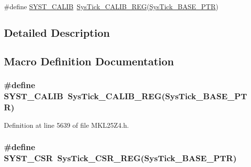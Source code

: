 \begin{DoxyCompactItemize}
\item 
\#define \hyperlink{group___sys_tick___register___accessor___macros_ga2d37582dd39f59744e340cce09230250}{S\+Y\+S\+T\+\_\+\+C\+A\+L\+IB}~\hyperlink{group___sys_tick___register___accessor___macros_gab41be68de8d2d31d938d419f9feb900f}{Sys\+Tick\+\_\+\+C\+A\+L\+I\+B\+\_\+\+R\+EG}(\hyperlink{group___sys_tick___peripheral_gaeef73642fdef722ce658e468dad877ea}{Sys\+Tick\+\_\+\+B\+A\+S\+E\+\_\+\+P\+TR})
\end{DoxyCompactItemize}


\subsection{Detailed Description}


\subsection{Macro Definition Documentation}
\subsubsection[{\texorpdfstring{S\+Y\+S\+T\+\_\+\+C\+A\+L\+IB}{SYST_CALIB}}]{\setlength{\rightskip}{0pt plus 5cm}\#define S\+Y\+S\+T\+\_\+\+C\+A\+L\+IB~{\bf Sys\+Tick\+\_\+\+C\+A\+L\+I\+B\+\_\+\+R\+EG}({\bf Sys\+Tick\+\_\+\+B\+A\+S\+E\+\_\+\+P\+TR})}\hypertarget{group___sys_tick___register___accessor___macros_ga2d37582dd39f59744e340cce09230250}{}\label{group___sys_tick___register___accessor___macros_ga2d37582dd39f59744e340cce09230250}


Definition at line 5639 of file M\+K\+L25\+Z4.\+h.

\subsubsection[{\texorpdfstring{S\+Y\+S\+T\+\_\+\+C\+SR}{SYST_CSR}}]{\setlength{\rightskip}{0pt plus 5cm}\#define S\+Y\+S\+T\+\_\+\+C\+SR~{\bf Sys\+Tick\+\_\+\+C\+S\+R\+\_\+\+R\+EG}({\bf Sys\+Tick\+\_\+\+B\+A\+S\+E\+\_\+\+P\+TR})}\hypertarget{group___sys_tick___register___accessor___macros_gab26b3fc75982181f81b185b206e897f6}{}\label{group___sys_tick___register___accessor___macros_gab26b3fc75982181f81b185b206e897f6}


